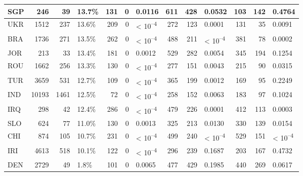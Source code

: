\begin{tabular}{l|r|r|l|r|r|l|r|r|l|r|r|l}
\hline
SGP & 246 & 39 & 13.7\% & 131 & 0 & 0.0116 & 611 & 428 & 0.0532 & 103 & 142 & 0.4764\\
\hline
UKR & 1512 & 237 & 13.6\% & 209 & 0 & < 10\textsuperscript{--4} & 272 & 123 & 0.0001 & 131 & 35 & 0.0091\\
\hline
BRA & 1736 & 271 & 13.5\% & 262 & 0 & < 10\textsuperscript{--4} & 488 & 211 & < 10\textsuperscript{--4} & 381 & 78 & 0.0002\\
\hline
JOR & 213 & 33 & 13.4\% & 181 & 0 & 0.0012 & 529 & 282 & 0.0054 & 345 & 194 & 0.1254\\
\hline
ROU & 1662 & 256 & 13.3\% & 130 & 0 & < 10\textsuperscript{--4} & 277 & 151 & 0.0043 & 215 & 90 & 0.0315\\
\hline
TUR & 3659 & 531 & 12.7\% & 109 & 0 & < 10\textsuperscript{--4} & 365 & 199 & 0.0012 & 169 & 95 & 0.2249\\
\hline
IND & 10193 & 1461 & 12.5\% & 72 & 0 & < 10\textsuperscript{--4} & 258 & 152 & 0.0063 & 183 & 97 & 0.1024\\
\hline
IRQ & 298 & 42 & 12.4\% & 286 & 0 & < 10\textsuperscript{--4} & 479 & 226 & 0.0001 & 412 & 113 & 0.0003\\
\hline
SLO & 624 & 77 & 11.0\% & 130 & 0 & 0.0013 & 325 & 213 & 0.0130 & 330 & 139 & 0.0154\\
\hline
CHI & 874 & 105 & 10.7\% & 231 & 0 & < 10\textsuperscript{--4} & 499 & 240 & < 10\textsuperscript{--4} & 529 & 151 & < 10\textsuperscript{--4}\\
\hline
IRI & 4613 & 518 & 10.1\% & 122 & 0 & < 10\textsuperscript{--4} & 296 & 239 & 0.1687 & 203 & 167 & 0.4732\\
\hline
DEN & 2729 & 49 & 1.8\% & 101 & 0 & 0.0065 & 477 & 429 & 0.1985 & 440 & 269 & 0.0617\\
\hline
\end{tabular}
